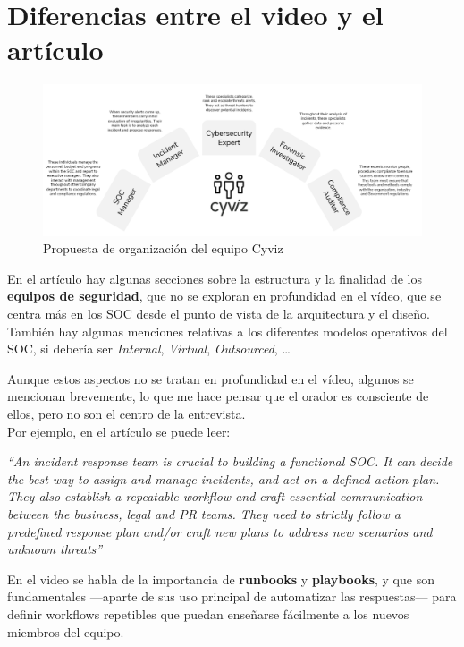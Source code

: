 \section{Diferencias entre el video y el artículo}
\begin{paracol}{2}
   

   \begin{figure}[htbp]
      \centering
      \includegraphics[width=0.95\columnwidth]{images/cyvizTeam.png}
      \caption{Propuesta de organización del equipo Cyviz}
      \label{fig:cyvizTeam}
   \end{figure}
   \switchcolumn
   \colfill
   En el artículo hay algunas secciones sobre la estructura y la finalidad de los \textbf{equipos de seguridad}, que no se exploran en profundidad en el vídeo, que se centra más en los SOC desde el punto de vista de la arquitectura y el diseño.\\
   También hay algunas menciones relativas a los diferentes modelos operativos del SOC, si debería ser \textit{Internal}, \textit{Virtual}, \textit{Outsourced}, \dots
   \colfill
\end{paracol}

Aunque estos aspectos no se tratan en profundidad en el vídeo, algunos se mencionan brevemente, lo que me hace pensar que el orador es consciente de ellos, pero no son el centro de la entrevista.\\
Por ejemplo, en el artículo se puede leer:
\begin{center}
   \textit{``An incident response team is crucial to building a functional SOC. It can decide the best way to assign and manage incidents, and
   act on a defined action plan. They also establish a repeatable workflow and craft essential communication between the business,
   legal and PR teams. They need to strictly follow a predefined response plan and/or craft new plans to address new scenarios and
   unknown threats''}
\end{center}

En el video se habla de la importancia de \textbf{runbooks} y \textbf{playbooks}, y que son fundamentales ---aparte de sus uso principal de automatizar las respuestas--- para definir workflows repetibles que puedan enseñarse fácilmente a los nuevos miembros del equipo.

